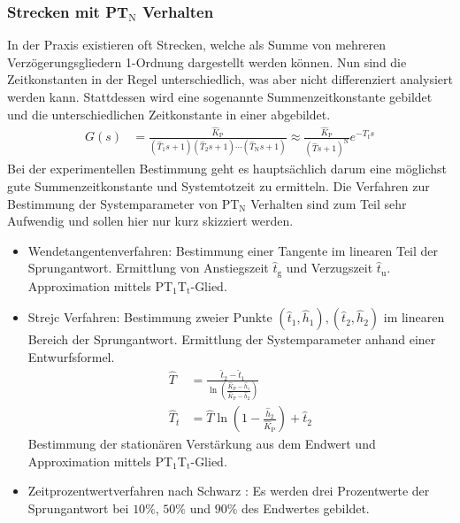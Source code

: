 \subsubsection{Strecken mit PT$_{\text{N}}$ Verhalten}
%
In der Praxis existieren oft Strecken, welche als Summe von mehreren Verzögerungsgliedern 1-Ordnung dargestellt werden können. Nun sind die Zeitkonstanten in der Regel unterschiedlich, was aber nicht differenziert analysiert werden kann. Stattdessen wird eine sogenannte Summenzeitkonstante gebildet und die unterschiedlichen Zeitkonstante in einer abgebildet.
%
\begin{equation*}
\begin{aligned}
%
G(s)&=\frac{\hat{K}_{\text{P}}}{\left(\hat{T}_{1}s+1\right)\left(\hat{T}_{2}s+1\right)\cdots\left(\hat{T}_{\text{N}}s+1\right)}\approx\frac{\hat{K}_{\text{P}}}{\left(\hat{T}s+1\right)^{\text{N}}}e^{-T_{t}s}%
%
\end{aligned}
\end{equation*}
%
Bei der experimentellen Bestimmung geht es hauptsächlich darum eine möglichst gute Summenzeitkonstante und Systemtotzeit zu ermitteln. Die Verfahren zur Bestimmung der Systemparameter von PT$_{\text{N}}$ Verhalten sind zum Teil sehr Aufwendig und sollen hier nur kurz skizziert werden.
%
\begin{itemize}
%
\item Wendetangentenverfahren: Bestimmung einer Tangente im linearen Teil der Sprungantwort. Ermittlung von Anstiegszeit $\hat{t}_{\text{g}}$ und Verzugszeit $\hat{t}_{\text{u}}$. Approximation mittels PT$_{\text{1}}$T$_{\text{t}}$-Glied.
%
\item Strejc Verfahren: Bestimmung zweier Punkte $(\hat{t}_{1},\hat{h}_{1}),(\hat{t}_{2},\hat{h}_{2})$ im linearen Bereich der Sprungantwort. Ermittlung der Systemparameter anhand einer Entwurfsformel. 
%
\begin{equation*}
\begin{aligned}
%
\hat{T} &= \frac{\hat{t}_{2}-\hat{t}_{1}}{\ln\left(\frac{\hat{K}_{\text{P}}-\hat{h}_{1}}{\hat{K}_{\text{P}}-\hat{h}_{2}}\right)}\\
%
\hat{T}_{t}&= \hat{T}\ln\left(1-\frac{\hat{h}_{2}}{\hat{K}_{\text{P}}}\right)+\hat{t}_{2}
%
\end{aligned}
\end{equation*}
%
Bestimmung der stationären Verstärkung aus dem Endwert und Approximation mittels PT$_{\text{1}}$T$_{\text{t}}$-Glied.
%
\item Zeitprozentwertverfahren nach Schwarz \cite{Zacher17}: Es werden drei Prozentwerte der Sprungantwort bei $10\%$, $50\%$ und $90\%$ des Endwertes gebildet.
%
\end{itemize}
